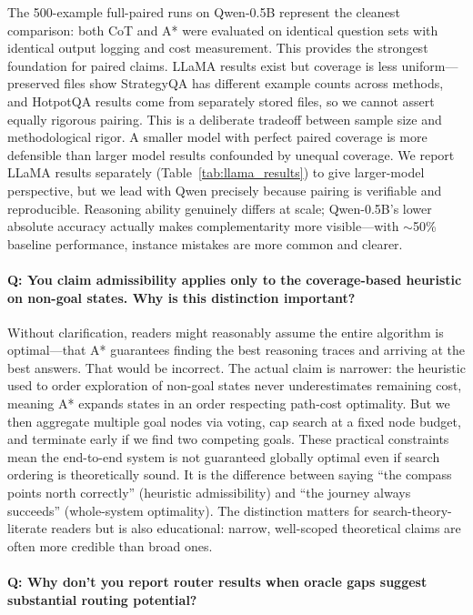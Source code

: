 \documentclass[11pt]{article}
\begin{document}
The 500-example full-paired runs on Qwen-0.5B represent the cleanest comparison: both CoT and A* were evaluated on identical question sets with identical output logging and cost measurement. This provides the strongest foundation for paired claims. LLaMA results exist but coverage is less uniform---preserved files show StrategyQA has different example counts across methods, and HotpotQA results come from separately stored files, so we cannot assert equally rigorous pairing. This is a deliberate tradeoff between sample size and methodological rigor. A smaller model with perfect paired coverage is more defensible than larger model results confounded by unequal coverage. We report LLaMA results separately (Table~\ref{tab:llama_results}) to give larger-model perspective, but we lead with Qwen precisely because pairing is verifiable and reproducible. Reasoning ability genuinely differs at scale; Qwen-0.5B's lower absolute accuracy actually makes complementarity more visible---with $\sim$50\% baseline performance, instance mistakes are more common and clearer.

\paragraph{Q: You claim admissibility applies only to the coverage-based heuristic on non-goal states. Why is this distinction important?}

Without clarification, readers might reasonably assume the entire algorithm is optimal---that A* guarantees finding the best reasoning traces and arriving at the best answers. That would be incorrect. The actual claim is narrower: the heuristic used to order exploration of non-goal states never underestimates remaining cost, meaning A* expands states in an order respecting path-cost optimality. But we then aggregate multiple goal nodes via voting, cap search at a fixed node budget, and terminate early if we find two competing goals. These practical constraints mean the end-to-end system is not guaranteed globally optimal even if search ordering is theoretically sound. It is the difference between saying ``the compass points north correctly'' (heuristic admissibility) and ``the journey always succeeds'' (whole-system optimality). The distinction matters for search-theory-literate readers but is also educational: narrow, well-scoped theoretical claims are often more credible than broad ones.

\paragraph{Q: Why don't you report router results when oracle gaps suggest substantial routing potential?}
\end{document}
